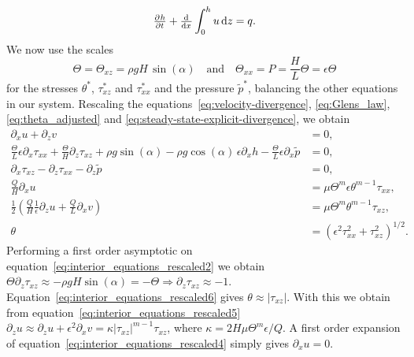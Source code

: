 %
\begin{equation}
    \pd{h}{t} + \od{}{x} \int_0^h u \dif{z} = q.
    \label{eq:conservation_of_matter_rescaled}
\end{equation}
%
We now use the scales
%
\begin{equation*}
    \Theta = \Theta_{xz} = \rho g H \, \sin (\alpha) \quad \text{and} \quad \Theta_{xx} = P = \frac{H}{L} \Theta = \epsilon \Theta
\end{equation*}
%
for the stresses $\theta^*$, $\tau_{xz}^*$ and $\tau_{xx}^*$ and the pressure $\tilde{p}^*$, balancing the other equations in our system. Rescaling the equations~\eqref{eq:velocity-divergence},  \eqref{eq:Glens_law}, \eqref{eq:theta_adjusted} and \eqref{eq:steady-state-explicit-divergence}, we obtain
%
\begin{subequations}
\begin{align}
    \partial_x u + \partial_z v &= 0, \label{eq:interior_equations_rescaled1}\\
    \frac{\Theta}{L} \epsilon \partial_x \tau_{xx} + \frac{\Theta}{H} \partial_z \tau_{xz} + \rho g \sin(\alpha) - \rho g \cos(\alpha) \, \epsilon \partial_x h - \frac{\Theta}{L} \epsilon \partial_x \tilde{p} &= 0, \label{eq:interior_equations_rescaled2}\\
    \partial_x \tau_{xz} - \partial_z \tau_{xx} - \partial_z \tilde{p} &= 0, \label{eq:interior_equations_rescaled3}\\
    \frac{Q}{H} \partial_x u &= \mu \Theta^m \epsilon \theta^{m-1} \tau_{xx}, \label{eq:interior_equations_rescaled4}\\
    \frac{1}{2}(\frac{Q}{H} \frac{1}{\epsilon} \partial_z u + \frac{Q}{L} \partial_x v) &= \mu \Theta^m \theta^{m-1} \tau_{xz}, \label{eq:interior_equations_rescaled5}\\
    \theta &= \left( \epsilon^2 \tau_{xx}^2 + \tau_{xz}^2 \right)^{1/2}. \label{eq:interior_equations_rescaled6}
\end{align}
\label{eq:interior_equations_rescaled}
\end{subequations}
%
Performing a first order asymptotic on equation~\eqref{eq:interior_equations_rescaled2} we obtain $\Theta \partial_z \tau_{xz} \approx - \rho g H \sin(\alpha) = - \Theta \Rightarrow \partial_z \tau_{xz} \approx -1$. Equation~\eqref{eq:interior_equations_rescaled6} gives $\theta \approx |\tau_{xz}|$. With this we obtain from equation~\eqref{eq:interior_equations_rescaled5} $\partial_z u \approx \partial_z u + \epsilon^2 \partial_x v = \kappa |\tau_{xz}|^{m-1} \tau_{xz}$, where $\kappa = 2H \mu \Theta^m \epsilon / Q$. A first order expansion of equation~\eqref{eq:interior_equations_rescaled4} simply gives $\partial_x u = 0$.
